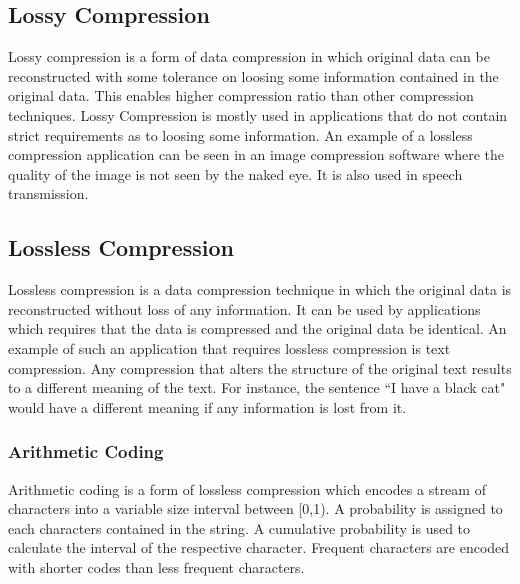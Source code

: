 \subsection{Lossy Compression}

Lossy compression \cite{Sayood:2000:IDC:336428} is a form of data compression in which original data can be reconstructed with some tolerance on loosing some information contained in the original data. This enables higher compression ratio than other compression techniques. Lossy Compression is mostly used in applications that do not contain strict requirements as to loosing some information. An example of a lossless compression application can be seen in an image compression software where the quality of the image is not seen by the naked eye. It is also used in speech transmission. 

\subsection{Lossless Compression}
Lossless compression \cite{Sayood:2000:IDC:336428} is a data compression technique in which the original data is reconstructed without loss of any information. It can be used by applications which requires that the data is compressed and the original data be identical. An example of such an application that requires lossless compression is text compression.  Any compression that alters the structure of the original text results to a different meaning of the text. For instance, the sentence ``I have a black cat" would have a different meaning if any information is lost from it.



\subsubsection{Arithmetic Coding}

Arithmetic coding is a form of lossless compression which encodes a stream of characters into a variable size interval between [0,1). A probability is assigned to each characters contained in the string. A cumulative probability is used to calculate the interval of the respective character. Frequent characters are encoded with shorter codes than less frequent characters. 
